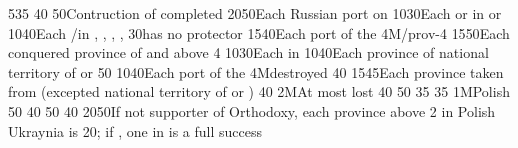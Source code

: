 %
%
%
{5}{35}{}%
%
%
{}{40}{}%
%
%
{}{50}{Contruction of  completed}%
%
%
{20}{50}{Each Russian port on }%
%
%
{10}{30}{Each \COL or \TP in  or }%
%
%
%
{10}{40}{Each \COL/\TP in \granderegionAmour, \granderegionBaikal,
  \granderegionAfghanistan, \granderegionPerse, \continentIndia}%
%
%
{}{30}{\paysPologne has no protector}%
%
%
{15}{40}{Each port of the \regionBaltique}%
%
\EUobjective4M{\payscrimee/\paysmoldavie}{prov-4}%
{15}{50}{Each conquered province of  and  above
  4}%
%
%
%
{10}{30}{Each \COL in \granderegionAlaska}%
%
%
%
{10}{40}{Each province of national territory of \paysgeorgie or \paysperse}%
%
%
{}{50}{}%
%
%
{10}{40}{Each port of the \regionBaltique}%
%
\EUobjective4M{\payscrimee destroyed}{}%
{}{40}{}%
%
%
{15}{45}{Each province taken from \paysmajeurTurquie (excepted national
  territory of \paysgeorgie or \paysperse)}%
%
 
%
%
{}{40}{}%
%
\EUobjective2M{At most \provinceSmolenska lost}{}%
{}{40}{}%
%
%
{}{50}{}%
%
%
{}{35}{}%
%
%
{}{35}{}%
%
%
\EUobjective1M{Polish \provinceSmolenska}{}%
{}{50}{}%
%
%
{}{40}{}%
%
%
{}{50}{}%
%
%
{}{40}{}%
%
%
{20}{50}{If not supporter of Orthodoxy, each province above 2 in Polish
  Ukraynia is 20\VPs; if \Xorthodoxe, one \COL in \continentSiberia is a full
  success}%
